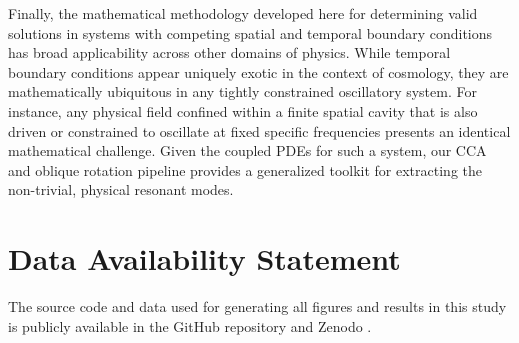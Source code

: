 Finally, the mathematical methodology developed here for determining valid solutions in systems with competing spatial and temporal boundary conditions has broad applicability across other domains of physics. While temporal boundary conditions appear uniquely exotic in the context of cosmology, they are mathematically ubiquitous in any tightly constrained oscillatory system. For instance, any physical field confined within a finite spatial cavity that is also driven or constrained to oscillate at fixed specific frequencies presents an identical mathematical challenge. Given the coupled PDEs for such a system, our CCA and oblique rotation pipeline provides a generalized toolkit for extracting the non-trivial, physical resonant modes.


\section*{Data Availability Statement}
The source code and data used for generating all figures and results in this study is publicly available in the GitHub repository \cite{code_for_figures_26xx.xxxx} and Zenodo \cite{code_for_figures_26xx}.

